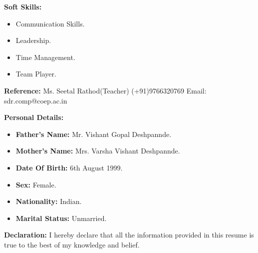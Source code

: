 \documentclass[a4paper,11pt]{article}
\begin{document}
\begin{minipage}[t]{0.4\textwidth}
			\raggedright\smallskip
			\begin{LARGE}
				 \textbf{Soft Skills:}\medskip%
				{\small
					\begin{itemize}
						\item {Communication Skills.}
						\item {Leadership.}
						\item {Time Management.}
						\item {Team Player.}
					\end{itemize}
				}
				\begin{Large}
				\vspace{0.4cm}
				\textbf{Reference:}\medskip\linebreak%
				{\small Ms. Seetal Rathod(Teacher) \linebreak%
				(+91)9766320769\linebreak%
				Email: sdr.comp@coep.ac.in
				}
				\end{Large}
			\end{LARGE}
			\vspace{0.5cm}	

\end{minipage}%
\hspace{0.6cm}
\begin{minipage}[t]{0.6\textwidth}
			\raggedright\smallskip
			\begin{LARGE}
				\textbf{Personal Details:}\medskip%
				{\small
					\begin{itemize}
						\item \textbf{Father's Name:} Mr. Vishant Gopal Deshpannde.
						\item \textbf{Mother's Name:} Mrs. Varsha Vishant Deshpannde.
						\item \textbf{Date Of Birth:} 6th August 1999.
						\item \textbf{Sex:} Female.
						\item \textbf{Nationality:} Indian.
						\item \textbf{Marital Status:} Unmarried.
					\end{itemize}
				}
			\end{LARGE}
			\vspace{0.65cm}

\end{minipage}%
\vspace{0.3cm}

\begin{Large}
				\textbf{Declaration:}\medskip\linebreak%
				\small I hereby declare that all the information provided in this resume is true to the best of my knowledge and belief.\linebreak%
			
			\end{Large}
\vspace{0.5cm}
\end{document}
